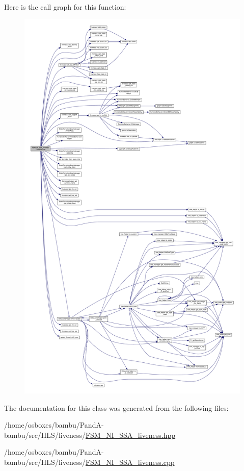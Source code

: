 Here is the call graph for this function\+:
\nopagebreak
\begin{figure}[H]
\begin{center}
\leavevmode
\includegraphics[height=550pt]{d4/dd8/classFSM__NI__SSA__liveness_a4779c2c3c70f08d16a164de63ecc25e9_cgraph}
\end{center}
\end{figure}


The documentation for this class was generated from the following files\+:\begin{DoxyCompactItemize}
\item 
/home/osboxes/bambu/\+Pand\+A-\/bambu/src/\+H\+L\+S/liveness/\hyperlink{FSM__NI__SSA__liveness_8hpp}{F\+S\+M\+\_\+\+N\+I\+\_\+\+S\+S\+A\+\_\+liveness.\+hpp}\item 
/home/osboxes/bambu/\+Pand\+A-\/bambu/src/\+H\+L\+S/liveness/\hyperlink{FSM__NI__SSA__liveness_8cpp}{F\+S\+M\+\_\+\+N\+I\+\_\+\+S\+S\+A\+\_\+liveness.\+cpp}\end{DoxyCompactItemize}
